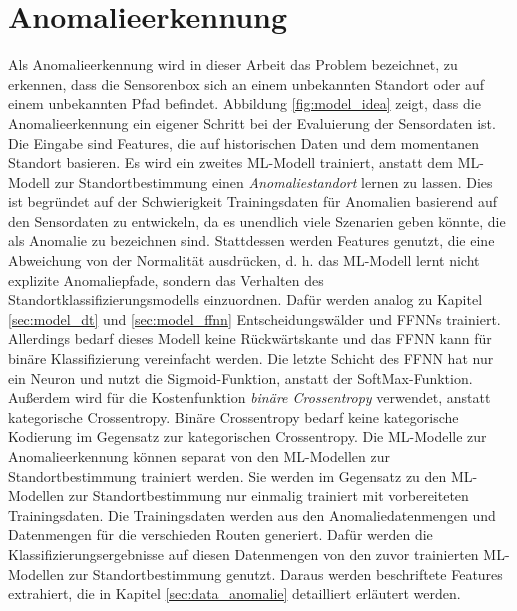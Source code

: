 \newpage
\section{Anomalieerkennung}
Als Anomalieerkennung wird in dieser Arbeit das Problem bezeichnet, zu erkennen, dass die Sensorenbox sich an einem
unbekannten Standort oder auf einem unbekannten Pfad befindet.
Abbildung \ref{fig:model_idea} zeigt, dass die Anomalieerkennung ein eigener Schritt bei der Evaluierung der Sensordaten ist.
Die Eingabe sind Features, die auf historischen Daten und dem momentanen Standort basieren.
\newline
\newline
Es wird ein zweites ML-Modell trainiert, anstatt dem ML-Modell zur Standortbestimmung einen \textit{Anomaliestandort} lernen zu lassen.
Dies ist begründet auf der Schwierigkeit Trainingsdaten für Anomalien basierend auf den Sensordaten zu entwickeln,
da es unendlich viele Szenarien geben könnte, die als Anomalie zu bezeichnen sind.
Stattdessen werden Features genutzt, die eine Abweichung von der Normalität ausdrücken,
d. h. das ML-Modell lernt nicht explizite Anomaliepfade, sondern das Verhalten des Standortklassifizierungsmodells einzuordnen.
\newline
\newline
Dafür werden analog zu Kapitel \ref{sec:model_dt} und \ref{sec:model_ffnn} Entscheidungswälder und FFNNs trainiert.
Allerdings bedarf dieses Modell keine Rückwärtskante und das FFNN kann für binäre Klassifizierung vereinfacht werden.
Die letzte Schicht des FFNN hat nur ein Neuron und nutzt die Sigmoid-Funktion, anstatt der SoftMax-Funktion.
Außerdem wird für die Kostenfunktion \textit{binäre Crossentropy} verwendet, anstatt kategorische Crossentropy.
Binäre Crossentropy bedarf keine kategorische Kodierung im Gegensatz zur kategorischen Crossentropy.
\newline
\newline
Die ML-Modelle zur Anomalieerkennung können separat von den ML-Modellen zur Standortbestimmung trainiert werden.
Sie werden im Gegensatz zu den ML-Modellen zur Standortbestimmung nur einmalig trainiert mit vorbereiteten Trainingsdaten.
Die Trainingsdaten werden aus den Anomaliedatenmengen und Datenmengen für die verschieden Routen generiert.
Dafür werden die Klassifizierungsergebnisse auf diesen Datenmengen von den zuvor trainierten ML-Modellen zur Standortbestimmung genutzt.
Daraus werden beschriftete Features extrahiert, die in Kapitel \ref{sec:data_anomalie} detailliert erläutert werden.
\newpage
